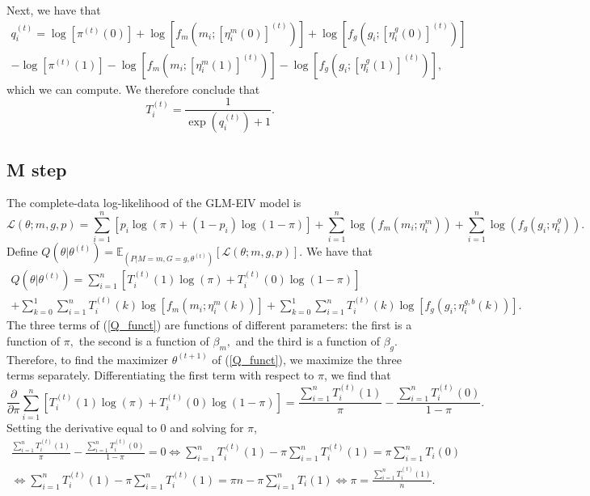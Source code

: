 \documentclass[12pt]{article}
\begin{document}
\begin{appendices}
\begin{refsection}
\begin{equation}
		\end{equation}
		Next, we have that
		\begin{multline*}
		q^{(t)}_i = \log\left[ \pi^{(t)}(0) \right] + \log\left[ f_m\left(m_i; \left[ \eta^m_i(0) \right]^{(t)}\right) \right] + \log\left[ f_g\left(g_i; \left[ \eta^g_i(0) \right]^{(t)}\right) \right] \\ - \log\left[ \pi^{(t)}(1) \right] - \log\left[ f_m\left(m_i; \left[ \eta^m_i(1) \right]^{(t)}\right) \right] - \log\left[ f_g\left(g_i; \left[ \eta^g_i(1) \right]^{(t)}\right) \right],
		\end{multline*}
		which we can compute. We therefore conclude that
		$$ T_i^{(t)} = \frac{1}{\exp\left(q^{(t)}_i\right) + 1}.$$
		\subsection*{M step}
		The complete-data log-likelihood of the GLM-EIV model  is
		\begin{equation}\label{full_log_lik}
		\mathcal{L}(\theta; m, g, p) = \sum_{i=1}^n \left[ p_i \log(\pi) + (1-p_i) \log(1-\pi) \right] + \sum_{i=1}^n \log\left( f_m(m_i; \eta^m_i)\right) + \sum_{i=1}^n \log\left( f_g(g_i; \eta_i^g) \right).
		\end{equation}
		Define $Q(\theta | \theta^{(t)}) = \mathbb{E}_{\left(P |M = m, G = g, \theta^{(t)}\right)}\left[ \mathcal{L}(\theta; m, g, p) \right].$ We have that
		\begin{multline}\label{Q_funct}
		Q(\theta |\theta^{(t)}) = \sum_{i=1}^n \left[T^{(t)}_i(1)\log(\pi) + T_i^{(t)}(0) \log(1 - \pi)\right] \\ + \sum_{k=0}^1 \sum_{i=1}^n T^{(t)}_i(k) \log \left[ f_m(m_i; \eta_i^m(k)) \right] + \sum_{k=0}^1 \sum_{i=1}^n T^{(t)}_i(k) \log \left[ f_g( g_i; \eta^{g,b}_i(k)) \right].
		\end{multline}
		The three terms of (\ref{Q_funct}) are functions of different parameters: the first is a function of $\pi,$ the second is a function of $\beta_m,$ and the third is a function of $\beta_g$. Therefore, to find the maximizer $\theta^{(t+1)}$ of (\ref{Q_funct}), we maximize the three terms separately. Differentiating the first term with respect to $\pi$, we find that
		\begin{equation*}
		\frac{ \partial }{\partial \pi } \sum_{i=1}^n \left[ T^{(t)}_i(1)\log(\pi) + T_i^{(t)}(0) \log(1 - \pi)\right]  = \frac{\sum_{i=1}^n T_i^{(t)}(1)}{\pi} - \frac{ \sum_{i=1}^n T_i^{(t)}(0) }{ 1 - \pi}.
		\end{equation*} Setting the derivative equal to $0$ and solving for $\pi$,
		\begin{multline*}
		\frac{\sum_{i=1}^n T_i^{(t)}(1)}{\pi} - \frac{ \sum_{i=1}^n T_i^{(t)}(0) }{ 1 - \pi} = 0 \iff \sum_{i=1}^n T_i^{(t)}(1) - \pi \sum_{i=1}^n T^{(t)}_i(1) = \pi \sum_{i=1}^n T_i(0) \\ \iff \sum_{i=1}^n T^{(t)}_i(1) - \pi\sum_{i=1}^n T_i^{(t)}(1) = \pi n - \pi\sum_{i=1}^n T_i(1) \iff \pi = \frac{ \sum_{i=1}^n T_i^{(t)} (1) }{n}.
	\end{multline*}


\end{refsection}
\end{appendices}
\end{document}

